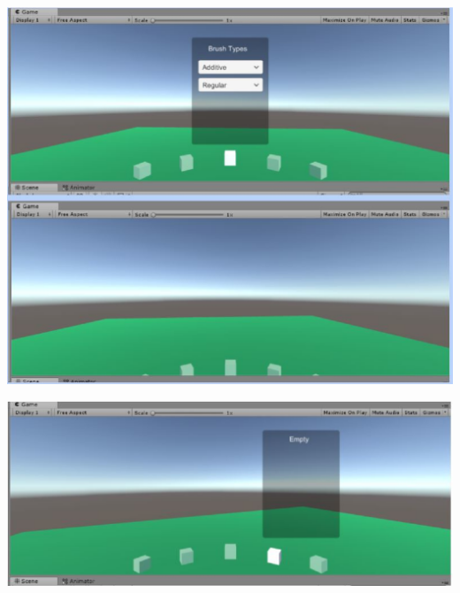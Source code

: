 \documentclass[onecolumn, draftclsnofoot,10pt, compsoc]{IEEEtran}
\begin{document}
\includegraphics{image1}

\includegraphics{image2}
\end{document}
